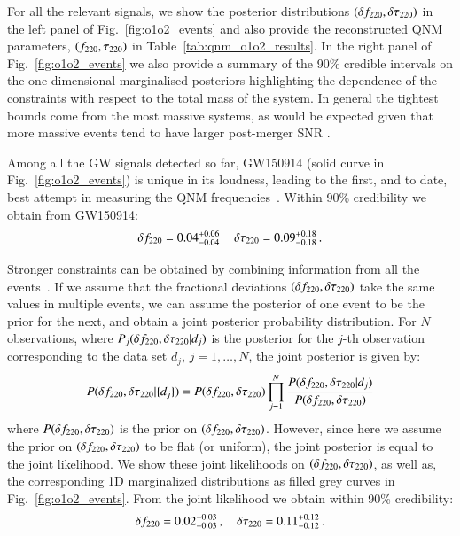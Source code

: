 For all the relevant signals, we show the posterior distributions $(\delta f_{\text{220}}, \delta \tau_{\text{220}})$ in the left panel  of Fig.~\ref{fig:o1o2_events} and also provide the reconstructed QNM parameters, $(f_{\text{220}}, \tau_{\text{220}})$ in Table~\ref{tab:qnm_o1o2_results}. In the right panel  of Fig.~\ref{fig:o1o2_events} we also provide a summary of the 90\% credible intervals on the one-dimensional marginalised posteriors highlighting the dependence of the constraints with respect to the total mass of the system. In general the tightest bounds come from the most massive systems, as would be expected given that more massive events tend to have larger post-merger SNR .
 
Among all the GW signals detected so far, GW150914 (solid curve in Fig.~\ref{fig:o1o2_events}) is unique in its loudness, leading to the first, and to date, best attempt in measuring the QNM frequencies~\cite{LSC_2016grtests,Brito:2018rfr,Carullo:2019flw,Isi:2019aib}. Within 90\% credibility we obtain from GW150914: 
%
\begin{equation}
\delta f_{\text{220}}=0.04^{+0.06}_{-0.04}\,\quad \delta \tau_{\text{220}}=0.09^{+0.18}_{-0.18}\,.
\end{equation}

Stronger constraints can be obtained by combining information from all the events~\cite{Abbott:2020jks}. If we assume that the fractional deviations $(\delta f_{\text{220}},\delta \tau_{\text{220}})$ take the same values in multiple events, we can assume
the posterior of one event to be the prior for the next, and obtain a
joint posterior probability distribution. For $N$ observations, where
$P_j(\delta f_{\text{220}}, \delta \tau_{\text{220}} | d_j)$ is the posterior for the $j$-th
observation corresponding to the data set $d_j$, $j=1,\dots,N$, the joint
posterior is given by:
%
\begin{equation}
P(\delta f_{\text{220}}, \delta \tau_{\text{220}} | \{d_j\}) = P(\delta f_{\text{220}}, \delta \tau_{\text{220}}) \prod _{j=1}^N \frac{P(\delta f_{\text{220}}, \delta \tau_{\text{220}} | d_j) }{P(\delta f_{\text{220}}, \delta \tau_{\text{220}})}
\end{equation}
%
where $P(\delta f_{\text{220}}, \delta \tau_{\text{220}})$ is the prior on $(\delta f_{\text{220}},
\delta \tau_{\text{220}})$. However, since here we assume the prior on $(\delta f_{\text{220}},
\delta \tau_{\text{220}})$ to be flat (or uniform), the joint posterior is equal to
the joint likelihood. We show these joint likelihoods on $(\delta f_{\text{220}}, \delta \tau_{\text{220}})$, as well as, the corresponding 1D marginalized distributions as filled grey curves in Fig.~\ref{fig:o1o2_events}. From the joint likelihood we obtain within 90\% credibility: 
%
\begin{equation}
\delta f_{\text{220}}=0.02^{+0.03}_{-0.03}\,,\quad \delta \tau_{\text{220}}=0.11^{+0.12}_{-0.12}\,.
\end{equation}
%


